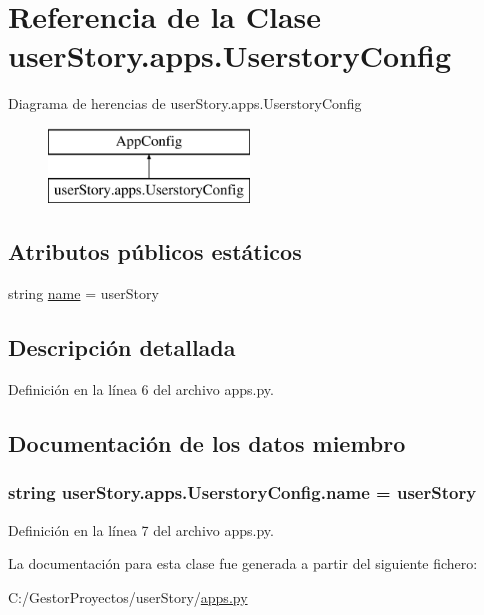 \hypertarget{classuser_story_1_1apps_1_1_userstory_config}{}\section{Referencia de la Clase user\+Story.\+apps.\+Userstory\+Config}
\label{classuser_story_1_1apps_1_1_userstory_config}
Diagrama de herencias de user\+Story.\+apps.\+Userstory\+Config\begin{figure}[H]
\begin{center}
\leavevmode
\includegraphics[height=2.000000cm]{classuser_story_1_1apps_1_1_userstory_config}
\end{center}
\end{figure}
\subsection*{Atributos públicos estáticos}
\begin{DoxyCompactItemize}
\item 
string \hyperlink{classuser_story_1_1apps_1_1_userstory_config_a79066f17973f6c14c6ed7d1986ead2cb}{name} = \textquotesingle{}user\+Story\textquotesingle{}
\end{DoxyCompactItemize}


\subsection{Descripción detallada}


Definición en la línea 6 del archivo apps.\+py.



\subsection{Documentación de los datos miembro}
\subsubsection[{\texorpdfstring{name}{name}}]{\setlength{\rightskip}{0pt plus 5cm}string user\+Story.\+apps.\+Userstory\+Config.\+name = \textquotesingle{}user\+Story\textquotesingle{}\hspace{0.3cm}{\ttfamily [static]}}\hypertarget{classuser_story_1_1apps_1_1_userstory_config_a79066f17973f6c14c6ed7d1986ead2cb}{}\label{classuser_story_1_1apps_1_1_userstory_config_a79066f17973f6c14c6ed7d1986ead2cb}


Definición en la línea 7 del archivo apps.\+py.



La documentación para esta clase fue generada a partir del siguiente fichero\+:\begin{DoxyCompactItemize}
\item 
C\+:/\+Gestor\+Proyectos/user\+Story/\hyperlink{user_story_2apps_8py}{apps.\+py}\end{DoxyCompactItemize}
